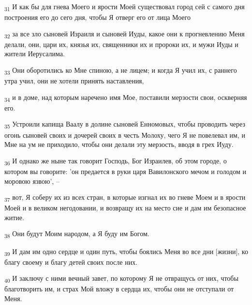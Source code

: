 \begin{tcolorbox}
\textsubscript{31} И как бы для гнева Моего и ярости Моей существовал город сей с самого дня построения его до сего дня, чтобы Я отверг его от лица Моего
\end{tcolorbox}
\begin{tcolorbox}
\textsubscript{32} за все зло сыновей Израиля и сыновей Иуды, какое они к прогневлению Меня делали, они, цари их, князья их, священники их и пророки их, и мужи Иуды и жители Иерусалима.
\end{tcolorbox}
\begin{tcolorbox}
\textsubscript{33} Они оборотились ко Мне спиною, а не лицем; и когда Я учил их, с раннего утра учил, они не хотели принять наставления,
\end{tcolorbox}
\begin{tcolorbox}
\textsubscript{34} и в доме, над которым наречено имя Мое, поставили мерзости свои, оскверняя его.
\end{tcolorbox}
\begin{tcolorbox}
\textsubscript{35} Устроили капища Ваалу в долине сыновей Енномовых, чтобы проводить через огонь сыновей своих и дочерей своих в честь Молоху, чего Я не повелевал им, и Мне на ум не приходило, чтобы они делали эту мерзость, вводя в грех Иуду.
\end{tcolorbox}
\begin{tcolorbox}
\textsubscript{36} И однако же ныне так говорит Господь, Бог Израилев, об этом городе, о котором вы говорите: 'он предается в руки царя Вавилонского мечом и голодом и моровою язвою', --
\end{tcolorbox}
\begin{tcolorbox}
\textsubscript{37} вот, Я соберу их из всех стран, в которые изгнал их во гневе Моем и в ярости Моей и в великом негодовании, и возвращу их на место сие и дам им безопасное житие.
\end{tcolorbox}
\begin{tcolorbox}
\textsubscript{38} Они будут Моим народом, а Я буду им Богом.
\end{tcolorbox}
\begin{tcolorbox}
\textsubscript{39} И дам им одно сердце и один путь, чтобы боялись Меня во все дни [жизни], ко благу своему и благу детей своих после них.
\end{tcolorbox}
\begin{tcolorbox}
\textsubscript{40} И заключу с ними вечный завет, по которому Я не отвращусь от них, чтобы благотворить им, и страх Мой вложу в сердца их, чтобы они не отступали от Меня.
\end{tcolorbox}
